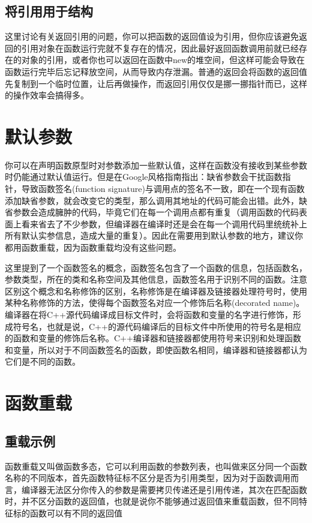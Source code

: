 \subsection{将引用用于结构}

这里讨论有关返回引用的问题，你可以把函数的返回值设为引用，但你应该避免返回的引用对象在函数运行完就不复存在的情况，因此最好返回函数调用前就已经存在的对象的引用，或者你也可以返回在函数中new的堆空间，但这样可能会导致在函数运行完毕后忘记释放空间，从而导致内存泄漏。普通的返回会将函数的返回值先复制到一个临时位置，让后再做操作，而返回引用仅仅是挪一挪指针而已，这样的操作效率会搞得多。

\section{默认参数}

你可以在声明函数原型时对参数添加一些默认值，这样在函数没有接收到某些参数时仍能通过默认值运行。但是在Google风格指南指出：缺省参数会干扰函数指针，导致函数签名(function signature)与调用点的签名不一致，即在一个现有函数添加缺省参数，就会改变它的类型，那么调用其地址的代码可能会出错。此外，缺省参数会造成臃肿的代码，毕竟它们在每一个调用点都有重复（调用函数的代码表面上看来省去了不少参数，但编译器在编译时还是会在每一个调用代码里统统补上所有默认实参信息，造成大量的重复）。因此在需要用到默认参数的地方，建议你都用函数重载，因为函数重载均没有这些问题。

这里提到了一个函数签名的概念，函数签名包含了一个函数的信息，包括函数名，参数类型，所在的类和名称空间及其他信息，函数签名用于识别不同的函数。注意区别这个概念和名称修饰的区别，名称修饰是在编译器及链接器处理符号时，使用某种名称修饰的方法，使得每个函数签名对应一个修饰后名称(decorated name)。编译器在将C++源代码编译成目标文件时，会将函数和变量的名字进行修饰，形成符号名，也就是说，C++的源代码编译后的目标文件中所使用的符号名是相应的函数和变量的修饰后名称。C++编译器和链接器都使用符号来识别和处理函数和变量，所以对于不同函数签名的函数，即使函数名相同，编译器和链接器都认为它们是不同的函数。

\section{函数重载}

\subsection{重载示例}

函数重载又叫做函数多态，它可以利用函数的参数列表，也叫做来区分同一个函数名称的不同版本，首先函数特征标不区分是否为引用类型，因为对于函数调用而言，编译器无法区分你传入的参数是需要拷贝传递还是引用传递，其次在匹配函数时，并不区分函数的返回值，也就是说你不能够通过返回值来重载函数，但不同特征标的函数可以有不同的返回值

